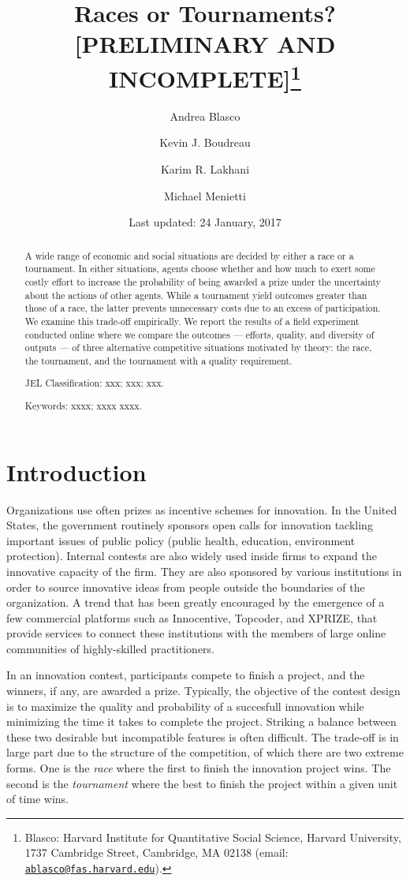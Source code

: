 \documentclass[12pt,]{article}
\title{Races or Tournaments? {[}PRELIMINARY AND INCOMPLETE{]}\thanks{Blasco: Harvard Institute for Quantitative Social Science, Harvard
University, 1737 Cambridge Street, Cambridge, MA 02138 (email:
\href{mailto:ablasco@fas.harvard.edu}{\nolinkurl{ablasco@fas.harvard.edu}}).}}
\author{Andrea Blasco \and Kevin J. Boudreau \and Karim R. Lakhani \and Michael Menietti}
\date{Last updated: 24 January, 2017}
\begin{document}
\maketitle
\begin{abstract}
A wide range of economic and social situations are decided by either a
race or a tournament. In either situations, agents choose whether and
how much to exert some costly effort to increase the probability of
being awarded a prize under the uncertainty about the actions of other
agents. While a tournament yield outcomes greater than those of a race,
the latter prevents unnecessary costs due to an excess of participation.
We examine this trade-off empirically. We report the results of a field
experiment conducted online where we compare the outcomes --- efforts,
quality, and diversity of outputs --- of three alternative competitive
situations motivated by theory: the race, the tournament, and the
tournament with a quality requirement.

\smallskip\noindent 
JEL Classification: xxx; xxx; xxx.

\smallskip\noindent 
Keywords: xxxx; xxxx xxxx.
\end{abstract}


\clearpage
\tableofcontents
\setcounter{tocdepth}{2}
\clearpage

\section{Introduction}\label{introduction}

Organizations use often prizes as incentive schemes for innovation. In
the United States, the government routinely sponsors open calls for
innovation tackling important issues of public policy (public health,
education, environment protection). Internal contests are also widely
used inside firms to expand the innovative capacity of the firm. They
are also sponsored by various institutions in order to source innovative
ideas from people outside the boundaries of the organization. A trend
that has been greatly encouraged by the emergence of a few commercial
platforms such as Innocentive, Topcoder, and XPRIZE, that provide
services to connect these institutions with the members of large online
communities of highly-skilled practitioners.

In an innovation contest, participants compete to finish a project, and
the winners, if any, are awarded a prize. Typically, the objective of
the contest design is to maximize the quality and probability of a
succesfull innovation while minimizing the time it takes to complete the
project. Striking a balance between these two desirable but incompatible
features is often difficult. The trade-off is in large part due to the
structure of the competition, of which there are two extreme forms. One
is the \emph{race} where the first to finish the innovation project
wins. The second is the \emph{tournament} where the best to finish the
project within a given unit of time wins.
\end{document}
